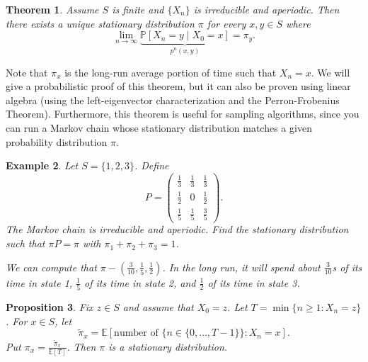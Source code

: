 \documentclass{tufte-handout}
\newcommand*\E{\mathbb{E}}
\renewcommand*\P{\mathbb{P}}
\newtheorem{thm}{Theorem}[subsection]
\newtheorem{ex}[thm]{Example}
\newtheorem{prop}[thm]{Proposition}
\theoremstyle{definition}
\begin{document}
\begin{thm}
	Assume $S$ is finite and $\{X_n\}$ is irreducible and aperiodic. Then there exists a unique stationary distribution $\pi$ for every $x,y \in S$ where \[
		\lim\limits_{n \to \infty} \underbrace{\P\left[X_n = y \mid X_0 = x\right] }_{p^{n}(x,y)} = \pi_y
	.\] 
\end{thm}

Note that $\pi_x$ is the long-run average portion of time such that $X_n = x$. We will give a probabilistic proof of this theorem, but it can also be proven using linear algebra (using the left-eigenvector characterization and the Perron-Frobenius Theorem). Furthermore, this theorem is useful for sampling algorithms, since you can run a Markov chain whose stationary distribution matches a given probability distribution $\pi$. 

\begin{ex}
	Let $S = \{1,2,3\}$. Define \[
		P = \begin{pmatrix}
			\frac{1}{3} & \frac{1}{3} & \frac{1}{3} \\
			\frac{1}{2} & 0 & \frac{1}{2} \\
			\frac{1}{5} & \frac{1}{5} & \frac{3}{5}
		\end{pmatrix} 
	.\] The Markov chain is irreducible and aperiodic. Find the stationary distribution such that $\pi P = \pi$ with $\pi_1 + \pi_2 + \pi_3 = 1$. 

	We can compute that $\pi - \left( \frac{3}{10}, \frac{1}{5}, \frac{1}{2} \right)$.
	In the long run, it will spend about $\frac{3}{10}$s of its time in state 1, $\frac{1}{5}$ of its time in state 2, and $\frac{1}{2}$ of its time in state 3.
\end{ex}

\begin{prop}
	Fix $z \in S$ and assume that $X_0 = z$. Let $T = \min \{n \ge 1 : X_n = z\}$. For $x \in S$, let \[
		\tilde{\pi}_x = \E\left[\text{number of } \{n \in \{0,\ldots,T-1\}\} : X_n = x\right] 
	.\] Put $\pi_x = \frac{\tilde{\pi}_x}{\E\left[T\right] }$. Then $\pi$ is a stationary distribution.
\end{prop}
\end{document}

